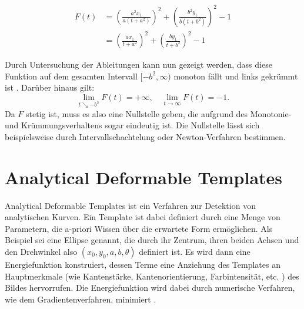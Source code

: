 \begin{enumerate}
\[
	\begin{aligned}
		F(t) &= \left(\frac{a^2x_1}{a\left(t+a^2\right)}\right)^2 + \left(\frac{b^2y_1}{b\left(t+b^2\right)}\right)^2 - 1 \\
		&= \left(\frac{ax_1}{t+a^2}\right)^2 + \left(\frac{by_1}{t+b^2}\right)^2 - 1
	\end{aligned}
\]

	Durch Untersuchung der Ableitungen kann nun gezeigt werden, dass diese Funktion auf dem gesamten Intervall $[-b^2,\infty)$ monoton fällt und links gekrümmt ist \cite{Eberly2013}. Darüber hinaus gilt:
	\[
	\lim\limits_{t \searrow -b^2}{F(t)}	= +\infty, \quad\lim\limits_{t \rightarrow \infty}{F(t)}	= -1.
	\]
	Da $F$ stetig ist, muss es also eine Nullstelle geben, die aufgrund des Monotonie- und Krümmungsverhaltens sogar eindeutig ist. Die Nullstelle lässt sich beispielsweise durch Intervallschachtelung oder Newton-Verfahren bestimmen.
\end{enumerate}


\section{Analytical Deformable Templates}
\label{s:anaDef}
Analytical Deformable Templates ist ein Verfahren zur Detektion von analytischen Kurven.
Ein Template ist dabei definiert durch eine Menge von Parametern, die a-priori Wissen über die erwartete Form ermöglichen.
Als Beispiel sei eine  Ellipse genannt, die durch ihr Zentrum, ihren beiden Achsen und den Drehwinkel also $(x_0,y_0,a,b,\theta)$ definiert ist.
Es wird dann eine Energiefunktion konstruiert, dessen Terme eine Anziehung des Templates an Hauptmerkmale (wie Kantenstärke, Kantenorientierung, Farbintensität, etc. ) des Bildes hervorrufen.
Die Energiefunktion wird dabei durch numerische Verfahren, wie dem Gradientenverfahren, minimiert \cite{Yuille1992}.
